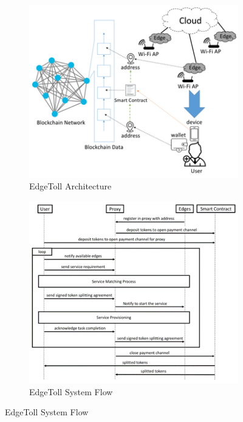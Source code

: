 \documentclass[a4paper,12pt,oneside, utf8x]{report}
\begin{document}
	\begin{figure}[H]
        \centering
        \begin{subfigure}[b]{.44\textwidth}
            \centering \includegraphics[width=0.99\linewidth]{figures/2-3.png}
            \caption{EdgeToll Architecture \cite{a18}}
            \label{f23et}
        \end{subfigure} 
        \begin{subfigure}[b]{.44\textwidth}
            \centering \includegraphics[width=0.99\linewidth]{figures/2-4.png}
            \caption{EdgeToll System Flow \cite{a18}}
            \label{f24et}
        \end{subfigure}
        \label{f2324}
    \end{figure}
    
\end{document}

